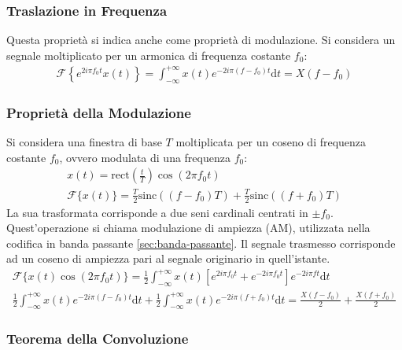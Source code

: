 \documentclass{article}
\newcommand{\rect}{\mathrm{rect}}
\newcommand{\sinc}{\mathrm{sinc}}
\newcommand{\df}{\mathrm{d}}
\numberwithin{equation}{subsection}
\begin{document}
\subsubsection{Traslazione in Frequenza}

Questa proprietà si indica anche come proprietà di modulazione. 
Si considera un segnale moltiplicato per un armonica di frequenza costante $f_0$:
\begin{gather}
    \mathscr{F}\left\{e^{2i\pi f_0t}x(t)\right\}=\displaystyle\int_{-\infty}^{+\infty}x(t)e^{-2i\pi(f-f_0)t}\df t=X(f-f_0)
\end{gather}

\subsubsection{Proprietà della Modulazione}

Si considera una finestra di base $T$ moltiplicata per un coseno di frequenza costante $f_0$, ovvero modulata di una frequenza $f_0$:
\begin{gather*}
    x(t)=\rect\displaystyle\left(\frac{t}{T}\right)\cos(2\pi f_0t)\\
    \mathscr{F}\{x(t)\}=\frac{T}{2}\sinc((f-f_0)T)+\frac{T}{2}\sinc\left((f+f_0)T\right)
\end{gather*}
La sua trasformata corrisponde a due seni cardinali centrati in $\pm f_0$. 
Quest'operazione si chiama modulazione di ampiezza (AM), utilizzata nella codifica in banda passante \ref{sec:banda-passante}. Il segnale trasmesso corrisponde ad un coseno di ampiezza pari al segnale originario 
in quell'istante.
\begin{gather*}
    \mathscr{F}\{x(t)\cos(2\pi f_0t)\}=\displaystyle\frac{1}{2}\int_{-\infty}^{+\infty}x(t)\left[e^{2i\pi f_0t}+e^{-2i\pi f_0t}\right]e^{-2i\pi ft}\df t\\
    \frac{1}{2}\displaystyle\int_{-\infty}^{+\infty}x(t)e^{-2i\pi(f-f_0)t}\df t+\frac{1}{2}\int_{-\infty}^{+\infty}x(t)e^{-2i\pi (f+f_0)t}\df t=\frac{X(f-f_0)}{2}+\frac{X(f+f_0)}{2}
\end{gather*}

\subsubsection{Teorema della Convoluzione}
\end{document}
